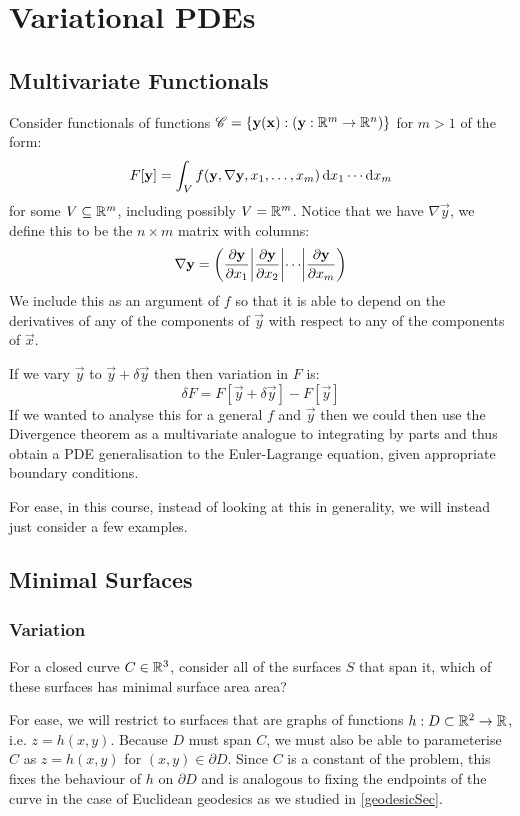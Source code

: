 \documentclass[../main.tex]{subfiles}
\begin{document}
\chapter{Variational PDEs}
\section{Multivariate Functionals}
Consider functionals of functions $\mathscr{C} = \{\mathbf{\bm{y}}(\mathbf{\bm{x}}): (\mathbf{\bm{y}}: \mathbb{R}^{m} \to \mathbb{R}^{n})\}$ for $m > 1$ of the form:
\[
  F[\vec{y}] = \int_{V} f(\vec{y}, \nabla \vec{y}, x_1, \ldots, x_m) \d{x_1} \cdots \d{x_m}
\]
for some $V \subseteq \mathbb{R}^{m}$, including possibly $V = \mathbb{R}^{m}$.
Notice that we have $\nabla \vec{y}$, we define this to be the $n \times m$ matrix with columns:
\[
  \nabla \vec{y} = \left(\pderiv{\vec{y}}{x_1} \middle\vert \pderiv{\vec{y}}{x_2} \middle\vert \cdots \middle\vert \pderiv{\vec{y}}{x_m}\right)
\]
We include this as an argument of $f$ so that it is able to depend on the derivatives of any of the components of $\vec{y}$ with respect to any of the components of $\vec{x}$.

If we vary $\vec{y}$ to $\vec{y} + \delta \vec{y}$ then then variation in $F$ is:
\[
  \delta F = F[\vec{y} + \delta \vec{y}] - F[\vec{y}]
\]
If we wanted to analyse this for a general $f$ and $\vec{y}$ then we could then use the Divergence theorem as a multivariate analogue to integrating by parts and thus obtain a PDE generalisation to the Euler-Lagrange equation, given appropriate boundary conditions.

For ease, in this course, instead of looking at this in generality, we will instead just consider a few examples.
\section{Minimal Surfaces}
\subsection{Variation}
For a closed curve $C \in \mathbb{R}^{3}$, consider all of the surfaces $S$ that span it, which of these surfaces has minimal surface area area?

For ease, we will restrict to surfaces that are graphs of functions $h: D \subset \mathbb{R}^{2} \to \mathbb{R}$, i.e. $z = h(x, y)$.
Because $D$ must span $C$, we must also be able to parameterise $C$ as $z = h(x, y)$ for $(x, y) \in \partial D$.
Since $C$ is a constant of the problem, this fixes the behaviour of $h$ on $\partial D$ and is analogous to fixing the endpoints of the curve in the case of Euclidean geodesics as we studied in \cref{geodesicSec}.
\end{document}
